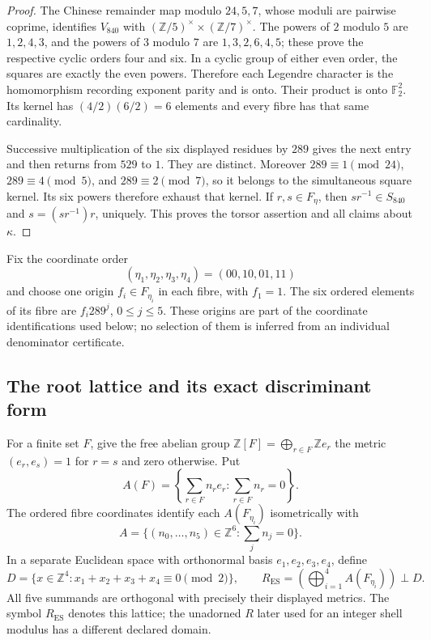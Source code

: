 \begin{proof}
The Chinese remainder map modulo \(24,5,7\), whose moduli are pairwise
coprime, identifies \(V_{840}\) with
\((\mathbb Z/5)^\times\times(\mathbb Z/7)^\times\).  The powers of
\(2\) modulo \(5\) are \(1,2,4,3\), and the powers of \(3\) modulo
\(7\) are \(1,3,2,6,4,5\); these prove the respective cyclic orders
four and six.  In a cyclic group of either even order, the squares are
exactly the even powers.  Therefore each Legendre character is the
homomorphism recording exponent parity and is onto.  Their product is
onto \(\mathbb F_2^2\).  Its kernel has
\((4/2)(6/2)=6\) elements and every fibre has that same cardinality.

Successive multiplication of the six displayed residues by \(289\)
gives the next entry and then returns from \(529\) to \(1\).
They are distinct.  Moreover \(289\equiv1\pmod {24}\),
\(289\equiv4\pmod5\), and \(289\equiv2\pmod7\), so it belongs to
the simultaneous square kernel.  Its six powers therefore exhaust that
kernel.  If \(r,s\in F_\eta\), then \(sr^{-1}\in S_{840}\) and
\(s=(sr^{-1})r\), uniquely.  This proves the torsor assertion and all
claims about \(\kappa\).
\end{proof}

Fix the coordinate order
\[
 (\eta_1,\eta_2,\eta_3,\eta_4)=(00,10,01,11)
\]
and choose one origin \(f_i\in F_{\eta_i}\) in each fibre, with
\(f_1=1\).  The six ordered elements of its fibre are
\(f_i289^j\), \(0\le j\le5\).  These origins are part of the
coordinate identifications used below; no selection of them is inferred
from an individual denominator certificate.

\subsection{The root lattice and its exact discriminant form}
\label{esn:subsec:root-and-discriminant}

For a finite set \(F\), give the free abelian group
\(\mathbb Z[F]=\bigoplus_{r\in F}\mathbb Ze_r\) the metric
\((e_r,e_s)=1\) for \(r=s\) and zero otherwise.  Put
\[
 A(F)=\left\{\sum_{r\in F}n_re_r:\sum_{r\in F}n_r=0\right\}.
\]
The ordered fibre coordinates identify each \(A(F_{\eta_i})\)
isometrically with
\[
 A=\{(n_0,\ldots,n_5)\in\mathbb Z^6:\textstyle\sum_j n_j=0\}.
\]
In a separate Euclidean space with orthonormal basis
\(e_1,e_2,e_3,e_4\), define
\begin{equation}
 D=\{x\in\mathbb Z^4:x_1+x_2+x_3+x_4\equiv0\pmod2\},
 \qquad R_{\mathrm{ES}}=
       \left(\bigoplus_{i=1}^4 A(F_{\eta_i})\right)\mathbin{\perp}D.
 \label{esn:eq:root-lattice}
\end{equation}
All five summands are orthogonal with precisely their displayed metrics.
The symbol \(R_{\mathrm{ES}}\) denotes this lattice; the unadorned
\(R\) later used for an integer shell modulus has a different declared
domain.

